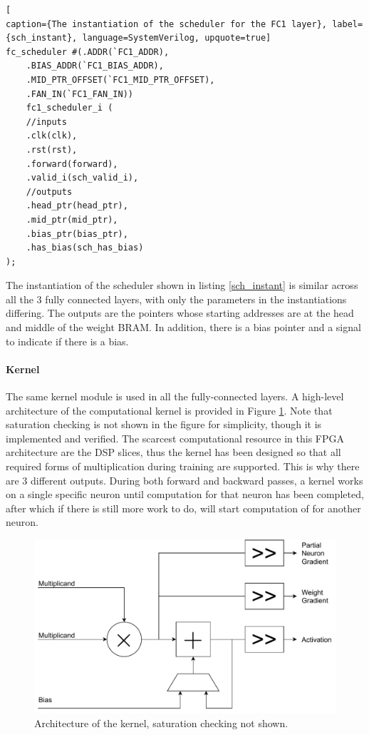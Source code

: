 \begin{lstlisting}[
caption={The instantiation of the scheduler for the FC1 layer}, label={sch_instant}, language=SystemVerilog, upquote=true]
fc_scheduler #(.ADDR(`FC1_ADDR), 
	.BIAS_ADDR(`FC1_BIAS_ADDR),
	.MID_PTR_OFFSET(`FC1_MID_PTR_OFFSET), 
	.FAN_IN(`FC1_FAN_IN)) 
	fc1_scheduler_i (
	//inputs
	.clk(clk),
	.rst(rst),
	.forward(forward),
	.valid_i(sch_valid_i),	
	//outputs
	.head_ptr(head_ptr),
	.mid_ptr(mid_ptr),
	.bias_ptr(bias_ptr),
	.has_bias(sch_has_bias)
);		
\end{lstlisting}
The instantiation of the scheduler shown in listing \ref{sch_instant} is similar across all the 3 fully connected layers, with only the parameters in the instantiations differing. The outputs are the pointers whose starting addresses are at the head and middle of the weight BRAM. In addition, there is a bias pointer and a signal to indicate if there is a bias.


\paragraph{Kernel}
The same kernel module is used in all the fully-connected layers. A high-level architecture of the computational kernel is provided in Figure \ref{kernel-arch}. Note that saturation checking is not shown in the figure for simplicity, though it is implemented and verified. The scarcest computational resource in this FPGA architecture are the DSP slices, thus the kernel has been designed so that all required forms of multiplication during training are supported. This is why there are 3 different outputs. During both forward and backward passes, a kernel works on a single specific neuron until computation for that neuron has been completed, after which if there is still more work to do, will start computation of for another neuron.

\begin{figure}
	\centering 
	\includegraphics[width=5in]{figures/kernel_arch}
	\caption{Architecture of the kernel, saturation checking not shown.}\label{kernel-arch}
\end{figure}

